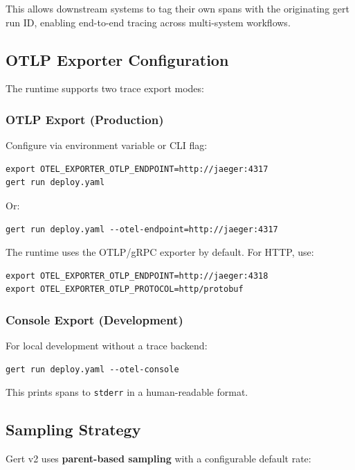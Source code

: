 This allows downstream systems to tag their own spans with the originating gert run ID, enabling end-to-end tracing across multi-system workflows.

\subsection{OTLP Exporter Configuration}

The runtime supports two trace export modes:

\subsubsection{OTLP Export (Production)}

Configure via environment variable or CLI flag:

\begin{verbatim}
export OTEL_EXPORTER_OTLP_ENDPOINT=http://jaeger:4317
gert run deploy.yaml
\end{verbatim}

Or:

\begin{verbatim}
gert run deploy.yaml --otel-endpoint=http://jaeger:4317
\end{verbatim}

The runtime uses the OTLP/gRPC exporter by default. For HTTP, use:

\begin{verbatim}
export OTEL_EXPORTER_OTLP_ENDPOINT=http://jaeger:4318
export OTEL_EXPORTER_OTLP_PROTOCOL=http/protobuf
\end{verbatim}

\subsubsection{Console Export (Development)}

For local development without a trace backend:

\begin{verbatim}
gert run deploy.yaml --otel-console
\end{verbatim}

This prints spans to \texttt{stderr} in a human-readable format.

\subsection{Sampling Strategy}

Gert v2 uses \textbf{parent-based sampling} with a configurable default rate:

